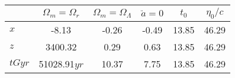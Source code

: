 \begin{tabular}{l|ccccc}
\toprule
  & $\Omega_m=\Omega_r$ & $\Omega_m=\Omega_\Lambda$ & $\ddot{a}=0$ & $t_0$ & $\eta_0 / c$ \\
\midrule
$x$ & -8.13 & -0.26 & -0.49 & 13.85 & 46.29 \\
$z$ & 3400.32 & 0.29 & 0.63 & 13.85 & 46.29 \\
$t\unit{Gyr}$ & 51028.91$\unit{yr}$ & 10.37 & 7.75 & 13.85 & 46.29 \\
\bottomrule
\end{tabular}
